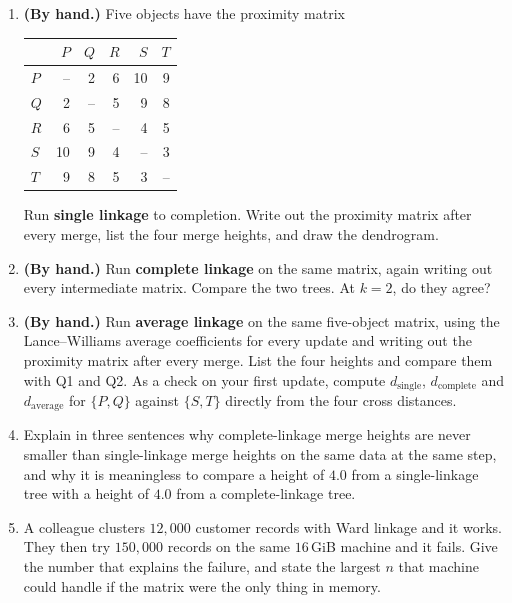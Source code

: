 \documentclass[11pt]{article}
\begin{document}
\begin{enumerate}[leftmargin=*, label=\textbf{Q\arabic*.}]
  \item \textbf{(By hand.)} Five objects have the proximity matrix
    \begin{center}\small
    \begin{tabular}{lrrrrr}
      \toprule
      & $P$ & $Q$ & $R$ & $S$ & $T$ \\
      \midrule
      $P$ & --  & 2 & 6 & 10 & 9 \\
      $Q$ & 2   & --& 5 & 9  & 8 \\
      $R$ & 6   & 5 & --& 4  & 5 \\
      $S$ & 10  & 9 & 4 & -- & 3 \\
      $T$ & 9   & 8 & 5 & 3  & -- \\
      \bottomrule
    \end{tabular}
    \end{center}
    Run \textbf{single linkage} to completion. Write out the proximity matrix
    after every merge, list the four merge heights, and draw the dendrogram.

  \item \textbf{(By hand.)} Run \textbf{complete linkage} on the same matrix,
    again writing out every intermediate matrix. Compare the two trees. At
    $k = 2$, do they agree?

  \item \textbf{(By hand.)} Run \textbf{average linkage} on the same
    five-object matrix, using the Lance--Williams average coefficients for
    every update and writing out the proximity matrix after every merge. List
    the four heights and compare them with Q1 and Q2. As a check on your first
    update, compute $d_{\text{single}}$, $d_{\text{complete}}$ and
    $d_{\text{average}}$ for $\{P,Q\}$ against $\{S,T\}$ directly from the
    four cross distances.

  \item Explain in three sentences why complete-linkage merge heights are
    never smaller than single-linkage merge heights on the same data at the
    same step, and why it is meaningless to compare a height of $4.0$ from a
    single-linkage tree with a height of $4.0$ from a complete-linkage tree.

  \item A colleague clusters $12{,}000$ customer records with Ward linkage
    and it works. They then
    try $150{,}000$ records on the same $16$\,GiB machine and it fails. Give
    the number that explains the failure, and state the largest $n$ that
    machine could handle if the matrix were the only thing in memory.


\end{enumerate}
\end{document}
